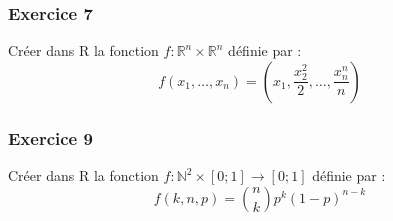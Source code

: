 \subsubsection{Exercice 7}
Créer dans R la fonction $f : \mathbb{R}^{n} \times \mathbb{R}^{n}$ définie par :
$$f(x_{1},\dots,x_{n}) = \left(x_{1},\frac{x_{2}^{2}}{2},\dots,\frac{x_{n}^{n}}{n}\right)$$

\subsubsection{Exercice 9}
Créer dans R la fonction $f : \mathbb{N}^{2} \times [0;1] \rightarrow [0; 1]$ définie par :
$$f(k,n,p) = \binom{n}{k}p^{k}(1-p)^{n-k}$$